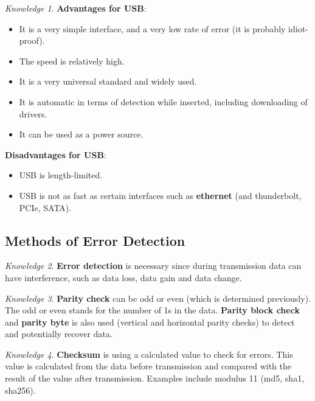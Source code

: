 \documentclass[8pt]{article}
\theoremstyle{remark}
\newtheorem{knowledge}{Knowledge}[subsection]
\begin{document}
        \begin{knowledge}
            \textbf{Advantages for USB}:
            \begin{itemize}
                \item It is a very simple interface, and a very low rate of error (it is probably idiot-proof).
                \item The speed is relatively high.
                \item It is a very universal standard and widely used.
                \item It is automatic in terms of detection while inserted, including downloading of drivers.
                \item It can be used as a power source.
            \end{itemize}

            \textbf{Disadvantages for USB}:
            \begin{itemize}
                \item USB is length-limited.
                \item USB is not as fast as certain interfaces such as \textbf{ethernet} (and thunderbolt, PCIe, SATA).
            \end{itemize}
        \end{knowledge}

        \subsection{Methods of Error Detection}

        \begin{knowledge}
            \textbf{Error detection} is necessary since during transmission data can have interference, such as data loss, data gain and data change.
        \end{knowledge}
        
        \begin{knowledge}
            \textbf{Parity check} can be odd or even (which is determined previously). The odd or even stands for the number of 1s in the data. \textbf{Parity block check} and \textbf{parity byte} is also used (vertical and horizontal parity checks) to detect and potentially recover data. 
        \end{knowledge}

        \begin{knowledge}
            \textbf{Checksum} is using a calculated value to check for errors. This value is calculated from the data before transmission and compared with the result of the value after transmission. Examples include modulus 11 (md5, sha1, sha256).
        \end{knowledge}
\end{document}
